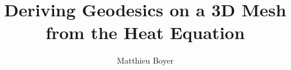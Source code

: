 \documentclass[math, info]{cours}
\title{Deriving Geodesics on a 3D Mesh from the Heat Equation}
\author{Matthieu Boyer}
\begin{document}
\bettertitle
\end{document}
